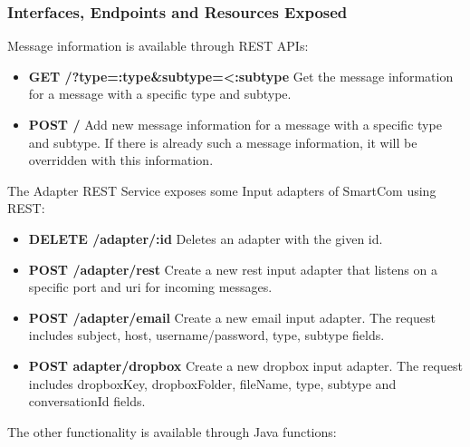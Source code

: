 \subsubsection{Interfaces, Endpoints and Resources Exposed}
Message information is available through REST APIs:
\begin{itemize}
\item {\bf GET	/?type=:type\&subtype=<:subtype} Get the message information for a message with a specific type and subtype.
\item {\bf POST	/}	Add new message information for a message with a specific type and subtype. If there is already such a message information, it will be overridden with this information.
\end{itemize}
The Adapter REST Service exposes some Input adapters of SmartCom using REST:
\begin{itemize}
\item {\bf DELETE /adapter/:id} Deletes an adapter with the given id.
\item {\bf POST /adapter/rest} Create a new rest input adapter that listens on a specific port and uri for incoming messages.
\item {\bf POST /adapter/email} Create a new email input adapter. The request includes subject, host, username/password, type, subtype fields.
\item {\bf POST adapter/dropbox} Create a new dropbox input adapter. The request includes dropboxKey, dropboxFolder, fileName, type, subtype and conversationId fields.
\end{itemize}
The other functionality is available through Java functions:
